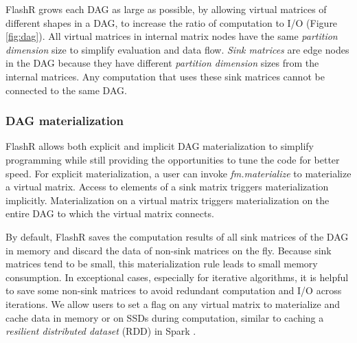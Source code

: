 FlashR grows each DAG as large as possible, by allowing virtual matrices
of different shapes in a DAG, to increase the ratio of computation to I/O
(Figure \ref{fig:dag}). All virtual matrices in internal matrix nodes have
the same \textit{partition dimension} size to simplify evaluation and data
flow. \textit{Sink matrices} are edge nodes
in the DAG because they have different \textit{partition dimension} sizes
from the internal matrices. Any computation that uses these
sink matrices cannot be connected to the same DAG.  

\subsubsection{DAG materialization}
FlashR allows both explicit and implicit DAG materialization to simplify
programming while still providing the opportunities to tune the code for
better speed. For explicit materialization, a user can invoke
\textit{fm.materialize} to materialize a virtual matrix. Access to elements
of a sink matrix triggers materialization implicitly. Materialization on
a virtual matrix triggers materialization on the entire DAG to which the virtual
matrix connects.

By default, FlashR saves the computation results of all sink matrices of
the DAG in memory and discard the data of non-sink matrices on the fly.
Because sink matrices tend to be small, this materialization
rule leads to small memory consumption.
In exceptional cases, especially for iterative algorithms,
it is helpful to save some non-sink matrices to avoid
redundant computation and I/O across iterations.  We allow users to
set a flag on any virtual matrix to materialize and cache data in memory
or on SSDs during computation, similar to caching
a \textit{resilient distributed dataset} (RDD) in Spark \cite{spark}.

